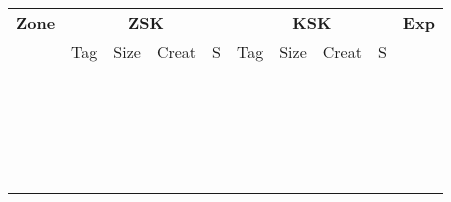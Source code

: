 \begin{center}
\begin{tabular}{|c|c|c|c|c|c|c|c|c|c|}
\hline
{\bf Zone} &
\multicolumn{4}{c|}{{\bf ZSK}} &
\multicolumn{4}{c|}{{\bf KSK}} &
{\bf Exp} \\
\cline{2-9}

 & Tag & Size & Creat & S & Tag & Size & Creat & S & \\
\hline

\hspace{1in} & \hspace{.5in} & \hspace{.5in} & \hspace{.5in} & & \hspace{.5in} & \hspace{.5in} & \hspace{.5in} & & \hspace{.5in} \\ 
 &  &  &  & &  &  &  & &  \\
 &  &  &  & &  &  &  & &  \\ \hline

 &  &  &  & &  &  &  & &  \\
 &  &  &  & &  &  &  & &  \\
 &  &  &  & &  &  &  & &  \\ \hline

 &  &  &  & &  &  &  & &  \\
 &  &  &  & &  &  &  & &  \\
 &  &  &  & &  &  &  & &  \\ \hline

 &  &  &  & &  &  &  & &  \\
 &  &  &  & &  &  &  & &  \\
 &  &  &  & &  &  &  & &  \\ \hline

 &  &  &  & &  &  &  & &  \\
 &  &  &  & &  &  &  & &  \\
 &  &  &  & &  &  &  & &  \\ \hline

 &  &  &  & &  &  &  & &  \\
 &  &  &  & &  &  &  & &  \\
 &  &  &  & &  &  &  & &  \\ \hline

 &  &  &  & &  &  &  & &  \\
 &  &  &  & &  &  &  & &  \\
 &  &  &  & &  &  &  & &  \\ \hline


\end{tabular}
\end{center}
